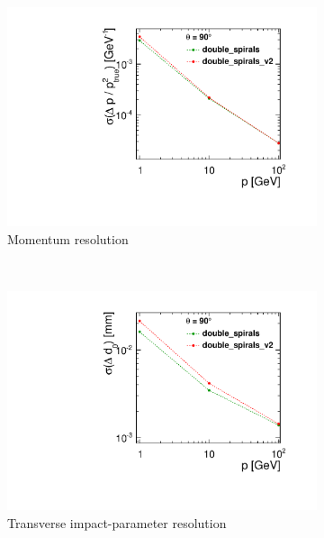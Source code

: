 \begin{figure}[H]
        \centering
        \begin{subfigure}[b]{0.5\textwidth}
          \centering
          \includegraphics[width=\textwidth]{Figures/Geometries/p_resolution_double_spirals_v2_theta90.pdf}
          \caption{Momentum resolution}
          \label{}
        \end{subfigure}%
        ~ 
        \begin{subfigure}[b]{0.5\textwidth}
          \centering
          \includegraphics[width=\textwidth]{Figures/Geometries/d0_resolution_double_spirals_v2_theta90.pdf}
          \caption{Transverse impact-parameter resolution}
          \label{}
        \end{subfigure}
        ~
        \begin{subfigure}[b]{\textwidth}

\end{subfigure}
\end{figure}
